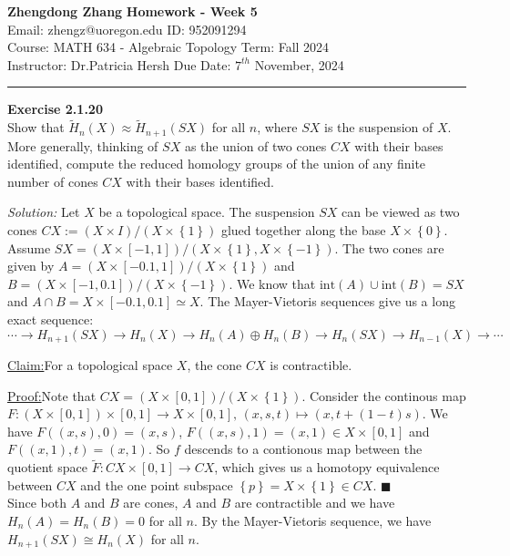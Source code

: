 \documentclass[a4paper, 12pt]{article}
\newenvironment{problem}[2][Exercise]
    { \begin{mdframed}[backgroundcolor=gray!20] \textbf{#1 #2} \\}
    {  \end{mdframed}}
\newenvironment{solution}
    {\textit{Solution:}}
    {}
\newenvironment{claim}[1]{\par\noindent\underline{Claim:}\space#1}{}
\newenvironment{claimproof}[1]{\par\noindent\underline{Proof:}\space#1}{\hfill $\blacksquare$}
\begin{document}
\noindent
\large\textbf{Zhengdong Zhang} \hfill \textbf{Homework - Week 5}   \\
Email: zhengz@uoregon.edu \hfill ID: 952091294 \\
\normalsize Course: MATH 634 - Algebraic Topology  \hfill Term: Fall 2024\\
Instructor: Dr.Patricia Hersh \hfill Due Date: $7^{th}$ November, 2024 \\
\noindent\rule{7in}{2.8pt}
\begin{problem}{2.1.20}
Show that \(\tilde{H}_n(X)\approx \tilde{H}_{n+1}(SX)\) for all \(n\), where \(SX\) is the suspension of \(X\). More generally, thinking of \(SX\) as the union 
of two cones \(CX\) with their bases identified, compute the reduced homology groups of the union of any finite number of cones \(CX\) with their bases identified. 
\end{problem}
\begin{solution}
Let \(X\) be a topological space. The suspension \(SX\) can be viewed as two cones \(CX:=(X\times I)/(X\times \left\{ 1 \right\})\) glued together along the base \(X\times \left\{ 0 \right\}\). Assume 
\(SX=(X\times [-1,1])/(X\times \left\{ 1 \right\},X\times \left\{ -1 \right\})\). The two cones are given by \(A=(X\times [-0.1,1])/(X\times \left\{ 1 \right\})\) and \(B=(X\times [-1,0.1])/(X\times \left\{ -1 \right\})\). 
We know that \(\text{int}(A)\cup \text{int}(B)=SX\) and \(A\cap B=X\times [-0.1,0.1]\simeq  X\). The Mayer-Vietoris sequences give us a long exact sequence:
\[\cdots\rightarrow H_{n+1}(SX)\rightarrow H_n(X)\rightarrow H_n(A)\oplus H_n(B)\rightarrow H_n(SX)\rightarrow H_{n-1}(X)\rightarrow \cdots\]
\begin{claim}
For a topological space \(X\), the cone \(CX\) is contractible.
\end{claim}
\begin{claimproof}
Note that \(CX=(X\times [0,1])/(X\times \left\{ 1 \right\})\).  Consider the continous map 
\(F:(X\times [0,1])\times [0,1]\rightarrow X\times [0,1],\, (x,s,t)\mapsto (x,t+(1-t)s)\). We have \(F((x,s),0)=(x,s)\), \(F((x,s),1)=(x,1)\in X\times [0,1]\) and \(F((x,1),t)=(x,1)\). So \(f\) descends to a 
contionous map between the quotient space \(\tilde{F}:CX\times [0,1]\rightarrow CX\), which gives us a homotopy equivalence between \(CX\) and the one point subspace \(\left\{ p \right\}=X\times \left\{ 1 \right\}\in CX\).
\end{claimproof}\\ 
Since both \(A\) and \(B\) are cones, \(A\) and \(B\) are contractible and we have \(H_n(A)=H_n(B)=0\) for all \(n\). By the Mayer-Vietoris sequence, we have \(H_{n+1}(SX)\cong H_n(X)\) for all \(n\). 
\end{solution}
\end{document}
